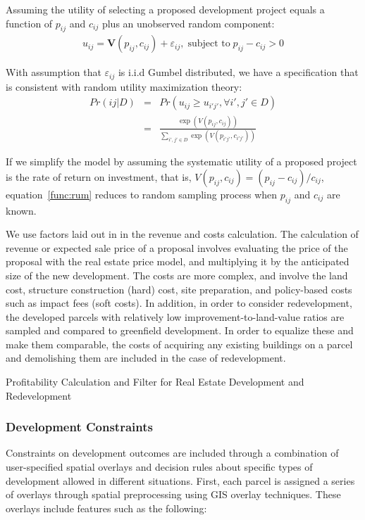 Assuming the utility of selecting a proposed development
project equals a function of $p_{ij}$ and $c_{ij}$
plus an unobserved random component:
\begin{eqnarray}
    u_{ij} = \mathbf{V}(p_{ij}, c_{ij}) + \varepsilon_{ij}, \; \mbox{subject to} \; p_{ij} - c_{ij} > 0
\end{eqnarray}

With assumption that $\varepsilon_{ij}$ is i.i.d Gumbel
distributed, we have a specification that is consistent with
random utility maximization theory:
\begin{eqnarray}
    Pr(ij|D) & = & Pr(u_{ij} \ge u_{i'j'}, \forall i',j' \in D ) \nonumber \\
             & = & \frac{\exp(V(p_{ij}, c_{ij}))}{\sum_{i',j' \in D}\exp(V(p_{i'j'}, c_{i'j'}))} \label{func:rum}
\end{eqnarray}

If we simplify the model by assuming the systematic utility
of a proposed project is the rate of return on investment,
that is, $V(p_{ij}, c_{ij}) = (p_{ij} - c_{ij}) / c_{ij}$,
equation~\ref{func:rum} reduces to random sampling process when
$p_{ij}$ and $c_{ij}$ are known.

We use factors laid out in \cite{Waddell2001a} in the
revenue and costs calculation.  The calculation of revenue
or expected sale price of a proposal involves evaluating the
price of the proposal with the real estate price model, and
multiplying it by the anticipated size of the new
development.  The costs are more complex, and involve
the land cost, structure construction (hard) cost, site
preparation, and policy-based costs such as impact fees
(soft costs).  In addition, in order to consider
redevelopment, the developed parcels with relatively low
improvement-to-land-value ratios are sampled and compared to
greenfield development.  In order to equalize these and make
them comparable, the costs of acquiring any existing
buildings on a parcel and demolishing them are included in
the case of redevelopment.

\begin{table}[ht]
\label{tab:profit-filter}
\begin{center}
  \caption{Profitability Calculation and Filter for Real
    Estate Development and Redevelopment }

\end{center}
\end{table}


\subsubsection{Development Constraints}
%
\label{sec-development-constraints}
%
Constraints on development outcomes are included through a
combination of user-specified spatial overlays and decision rules
about specific types of development allowed in different
situations.  First, each parcel is assigned a series of overlays
through spatial preprocessing using GIS overlay techniques.  These
overlays include features such as the following:


